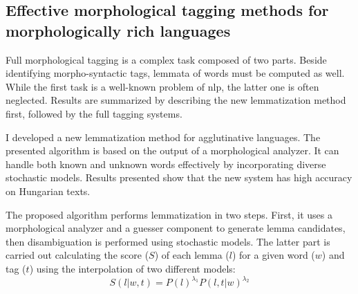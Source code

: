 \renewcommand{\thesubsection}{\Roman{subsection}}

%
%

\subsection{Effective morphological tagging methods for morphologically rich languages} %
\label{thes:morf}

Full morphological tagging is a complex task composed of two parts. 
Beside identifying morpho-syntactic tags, lemmata of words must be computed as well.
While the first task is a well-known problem of \acrlong{nlp}, the latter one is often neglected.
Results are summarized by describing  the new lemmatization method first, followed by the full tagging systems. 


\begin{core}
\begin{thesis}\label{thes:morf-lemma}
I developed a new lemmatization method for agglutinative languages.
The presented algorithm is based on the output of a morphological analyzer. It can handle both known and unknown words effectively by incorporating diverse stochastic models. 
Results presented show that the new system has high accuracy on Hungarian texts.
\end{thesis} 

\begin{pub}
\cite{Orosz2011,Orosz2012,Orosz2012a,Orosz2013a}
\end{pub}
\end{core}

The proposed algorithm performs lemmatization in two steps. 
First, it uses a morphological analyzer and a guesser component to generate lemma candidates, then disambiguation is performed using stochastic models.
The latter part is carried out calculating the score ($S$) of each lemma ($l$) for a given word ($w$) and tag ($t$) using the interpolation of two different models:
\begin{equation} %
S(l|w,t) = P(l)^{\lambda_1} P(l,t|w)^{\lambda_2}
\end{equation}

